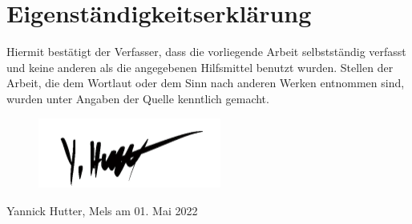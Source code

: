 \documentclass[12pt, oneside]{article}
\begin{document}
\clearpage
\section*{Eigenständigkeitserklärung}
Hiermit bestätigt der Verfasser, dass die vorliegende Arbeit selbstständig verfasst und keine anderen als die angegebenen Hilfsmittel benutzt wurden. Stellen der Arbeit, die dem Wortlaut oder dem Sinn nach anderen Werken entnommen sind, wurden unter Angaben der Quelle kenntlich gemacht.

\begin{figure}[ht]
	\includegraphics[width=6cm]{images/signature.png}
\end{figure}
Yannick Hutter, Mels am 01. Mai 2022
\end{document}

